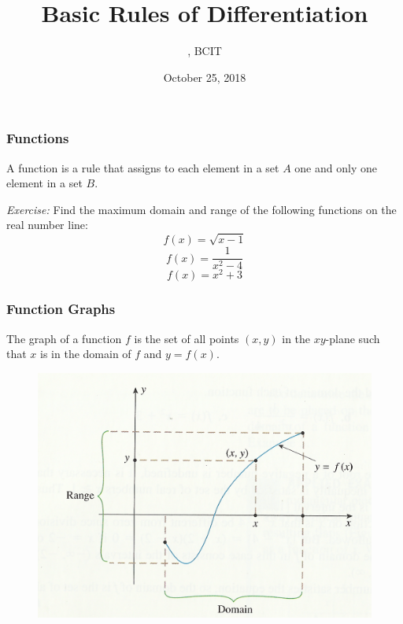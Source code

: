 \documentclass[xcolor=dvipsnames]{beamer}
\title{Basic Rules of Differentiation}
\subtitle{{\CourseNumber}, BCIT}
\author{\CourseName}
\date{October 25, 2018}
\begin{document}
\begin{frame}
  \titlepage
\end{frame}

\begin{frame}
  \frametitle{Functions}
A \alert{function} is a rule that assigns to each element in a set $A$ one and
only one element in a set $B$.

\medskip

\emph{Exercise:} Find the maximum domain and range of the following
functions on the real number line:
\begin{equation}
  \label{eq:sijoomai}
  f(x)=\sqrt{x-1}
\end{equation}
\begin{equation}
  \label{eq:vooghahk}
  f(x)=\frac{1}{x^{2}-4}
\end{equation}
\begin{equation}
  \label{eq:zaekohxi}
  f(x)=x^{2}+3
\end{equation}
\end{frame}

\begin{frame}
  \frametitle{Function Graphs}
The \alert{graph of a function} $f$ is the set of all points $(x,y)$
in the $xy$-plane such that $x$ is in the domain of $f$ and $y=f(x)$.
  \begin{figure}[h]
    \includegraphics[scale=1]{./diagrams/fgraph-02.png}
  \end{figure}
\end{frame}
\end{document}
